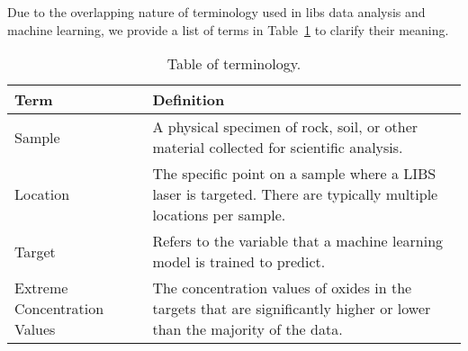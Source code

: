 Due to the overlapping nature of terminology used in \gls{libs} data analysis and machine learning, we provide a list of terms in Table~\ref{tab:terms} to clarify their meaning.

\begin{table}
\centering
\caption{Table of terminology.}
\begin{tabularx}{\columnwidth}{lX} %
\toprule
Term & Definition \\
\midrule
Sample & A physical specimen of rock, soil, or other material collected for scientific analysis.\\
Location & The specific point on a sample where a LIBS laser is targeted. There are typically multiple locations per sample. \\
Target & Refers to the variable that a machine learning model is trained to predict. \\
Extreme Concentration Values & The concentration values of oxides in the targets that are significantly higher or lower than the majority of the data. \\
\bottomrule
\end{tabularx}
\label{tab:terms}
\end{table}